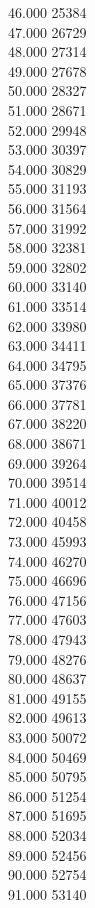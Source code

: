 { 46.000	25384 \\
 47.000	26729 \\
 48.000	27314 \\
 49.000	27678 \\
 50.000	28327 \\
 51.000	28671 \\
 52.000	29948 \\
 53.000	30397 \\
 54.000	30829 \\
 55.000	31193 \\
 56.000	31564 \\
 57.000	31992 \\
 58.000	32381 \\
 59.000	32802 \\
 60.000	33140 \\
 61.000	33514 \\
 62.000	33980 \\
 63.000	34411 \\
 64.000	34795 \\
 65.000	37376 \\
 66.000	37781 \\
 67.000	38220 \\
 68.000	38671 \\
 69.000	39264 \\
 70.000	39514 \\
 71.000	40012 \\
 72.000	40458 \\
 73.000	45993 \\
 74.000	46270 \\
 75.000	46696 \\
 76.000	47156 \\
 77.000	47603 \\
 78.000	47943 \\
 79.000	48276 \\
 80.000	48637 \\
 81.000	49155 \\
 82.000	49613 \\
 83.000	50072 \\
 84.000	50469 \\
 85.000	50795 \\
 86.000	51254 \\
 87.000	51695 \\
 88.000	52034 \\
 89.000	52456 \\
 90.000	52754 \\
 91.000	53140 \\
}

